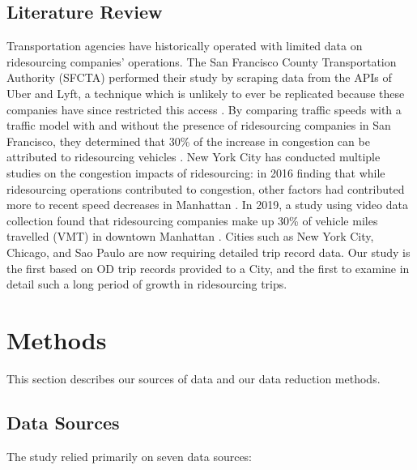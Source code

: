 \documentclass[]{trbunofficial_bdit_final}
\begin{document}
\hypertarget{sec:literature_review}{%
\subsection{Literature Review}\label{sec:literature_review}}

Transportation agencies have historically operated with limited data on
ridesourcing companies' operations. The San Francisco County
Transportation Authority (SFCTA) performed their study by scraping
data from the APIs of Uber and Lyft, a technique which is unlikely to ever be
replicated because these companies have since restricted this access
\cite{cooper2018profiling}. By comparing traffic speeds with a traffic model with
and without the presence of ridesourcing companies in San Francisco, they determined
that 30\% of the increase in congestion can be attributed to ridesourcing vehicles
\cite{Erhardteaau2670}. New York City has conducted multiple studies on the
congestion impacts of ridesourcing: in 2016 finding that while ridesourcing
operations contributed to congestion, other factors had contributed more to
recent speed decreases in Manhattan \cite{nyc2016report}. In 2019, a study using video
data collection found that ridesourcing companies make up 30\% of vehicle miles
travelled (VMT) in downtown Manhattan \cite{nyctlc2019report}. Cities such as
New York City, Chicago, and Sao Paulo are now requiring detailed trip record
data. Our study is the first based on OD trip records provided to a City, and
the first to examine in detail such a long period of growth in ridesourcing trips.

\hypertarget{sec:methods}{%
\section{Methods}\label{sec:methods}}

This section describes our sources of data and our data reduction methods.

\hypertarget{data-sources}{%
\subsection{Data Sources}\label{data-sources}}

The study relied primarily on seven data sources:
\end{document}
